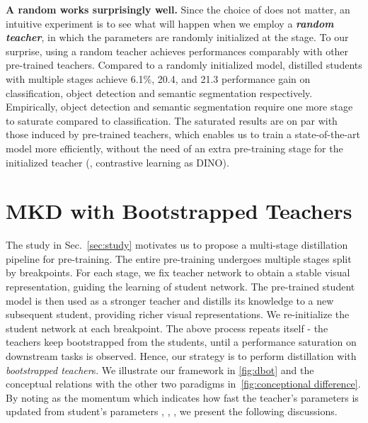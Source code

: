\documentclass[10pt,twocolumn,letterpaper]{article}
\renewcommand{\paragraph}[1]{\vspace{1.25mm}\noindent\textbf{#1}}
\begin{document}
\paragraph{A random  works surprisingly well.}
Since the choice of  does not matter, an intuitive experiment is to see what will happen when we employ a \textbf{\textit{random teacher}}, in which the parameters are randomly initialized at the  stage.
To our surprise, using a random teacher achieves performances comparably with other pre-trained teachers. 
Compared to a randomly initialized model, distilled students with multiple stages achieve 6.1\%, 20.4, and 21.3 performance gain on classification, object detection and semantic segmentation respectively. Empirically, object detection and semantic segmentation require one more stage to saturate compared to classification. 
The saturated results are on par with those induced by pre-trained teachers, which enables us to train a state-of-the-art model more efficiently, without the need of an extra pre-training stage for the initialized teacher (\eg, contrastive learning as DINO).

\section{MKD with Bootstrapped Teachers}
The study in Sec.~\ref{sec:study} motivates us to propose a multi-stage distillation pipeline for pre-training. 
The entire pre-training undergoes multiple stages split by breakpoints.
For each stage, we fix teacher network to obtain a stable visual representation, guiding the learning of student network. 
The pre-trained student model is then used as a stronger teacher and distills its knowledge to a new subsequent student, providing richer visual representations.
We re-initialize the student network at each breakpoint. 
The above process repeats itself - the teachers keep bootstrapped from the students, until a performance saturation on downstream tasks is observed. 
Hence, our strategy is to perform distillation with \textit{bootstrapped teacher}s. We illustrate our framework in \cref{fig:dbot} and the conceptual relations with the other two paradigms in~\cref{fig:conceptional difference}. 
By noting  as the momentum which indicates how fast the teacher's parameters  is updated from student's parameters , \ie, , we present the following discussions.
\end{document}

